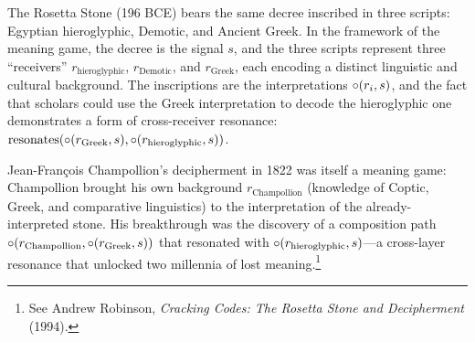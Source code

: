 \begin{example}
\label{ex:rosetta_stone}
The Rosetta Stone (196 BCE) bears the same decree inscribed in three
scripts: Egyptian hieroglyphic, Demotic, and Ancient Greek.  In the
framework of the meaning game, the decree is the signal $s$, and the
three scripts represent three ``receivers'' $r_{\text{hieroglyphic}}$,
$r_{\text{Demotic}}$, and $r_{\text{Greek}}$, each encoding a distinct
linguistic and cultural background.  The inscriptions are the interpretations
$\circ(r_i, s)$, and the fact that scholars could use the Greek
interpretation to decode the hieroglyphic one demonstrates a form of
cross-receiver resonance: $\text{resonates}(\circ(r_{\text{Greek}}, s),
\circ(r_{\text{hieroglyphic}}, s))$.

Jean-Fran\c{c}ois Champollion's decipherment in 1822 was itself a meaning
game: Champollion brought his own background $r_{\text{Champollion}}$
(knowledge of Coptic, Greek, and comparative linguistics) to the
interpretation of the already-interpreted stone.  His breakthrough was
the discovery of a composition path
$\circ(r_{\text{Champollion}}, \circ(r_{\text{Greek}}, s))$ that
resonated with $\circ(r_{\text{hieroglyphic}}, s)$---a cross-layer
resonance that unlocked two millennia of lost meaning.\footnote{See
Andrew Robinson, \textit{Cracking Codes: The Rosetta Stone and
Decipherment} (1994).}
\end{example}

